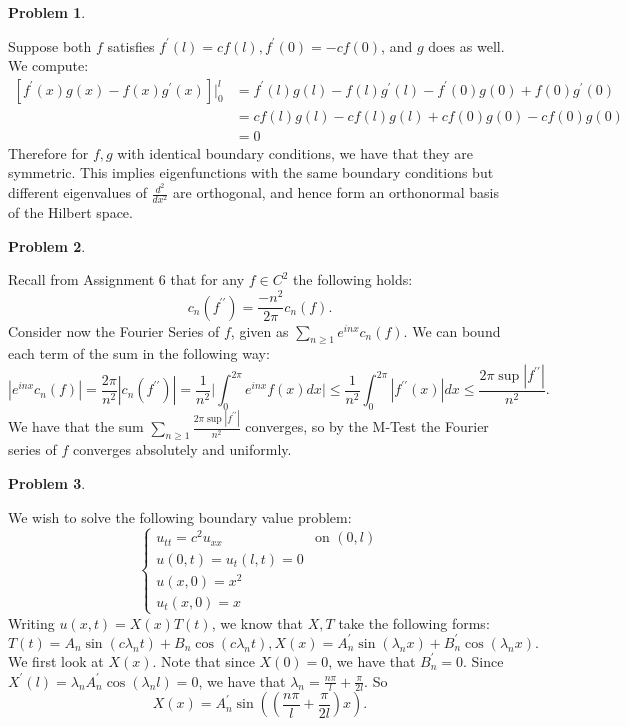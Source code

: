 \documentclass[12pt, a4paper]{article}
\title{}
\author{A.N.}
\date{\today}
\newtheorem{problem}{Problem}
\theoremstyle{definition}
\begin{document}
\begin{problem}
\end{problem}
 Suppose both $f$ satisfies $f^\prime(l) =cf(l), f^\prime(0) = - cf(0)$, and $g$ does as well.  We compute: 
 \begin{align*}
 \left[f^\prime(x) g(x) - f(x)g^\prime(x)\right] \Big|_0^l& = f^\prime(l)g(l) - f(l)g^\prime(l)- f^\prime(0)g(0) + f(0)g^\prime(0)
 \\ & = cf(l)g(l)-cf(l)g(l)+ cf(0)g(0)- cf(0)g(0)
 \\ & = 0
 \end{align*}
 Therefore for $f,g$ with identical boundary conditions, we have that they are symmetric. This implies eigenfunctions with the same boundary conditions but different eigenvalues of $\frac{d^2}{dx^2}$ are orthogonal, and hence form an orthonormal basis of the Hilbert space. 
 \newpage 
\begin{problem}
\end{problem}
Recall from Assignment 6 that for any $f\in C^2$ the following holds: $$c_n(f^{\prime \prime}) = \frac{-n^2}{2\pi} c_n(f).$$
Consider now the Fourier Series of $f$, given as $\sum_{n\geq 1}e^{inx}c_n(f)$. We can bound each term of the sum in the following way: 
$$|e^{inx}c_n(f)| = \frac{2\pi}{n^2}|c_n(f^{\prime \prime})| = \frac{1}{n^2} \Big|\int_0^{2\pi } e^{inx}f(x) dx
 \Big| \leq \frac{1}{n^2} \int_0^{2\pi} |f^{\prime \prime}(x)|dx \leq \frac{2\pi \sup|f^{\prime \prime}|}{n^2}.$$
 We have that the sum $\sum_{n\geq 1} \frac{2\pi \sup |f^{\prime \prime}|}{n^2}$ converges, so by the M-Test the Fourier series of $f$ converges absolutely and uniformly.
 \newpage 
\begin{problem}
\end{problem}
We wish to solve the following boundary value problem: 
$$\begin{cases}
	u_{tt} = c^2u_{xx} &\text{on $(0,l)$}\\
	u(0,t) = u_t(l,t) = 0 \\
	u(x,0)=x^2\\
	u_t(x,0) = x
\end{cases}$$
Writing $u(x,t) = X(x)T(t)$, we know that $X,T$ take the following forms: 
$$T(t) = A_n \sin(c\lambda_n t) + B_n \cos (c \lambda_n t), X(x) = A_n^\prime \sin(\lambda_n x) + B_n^\prime \cos(\lambda_n x).$$
We first look at $X(x)$. Note that since $X(0)=0$, we have that $B_n^\prime = 0$. Since $X^\prime(l)= \lambda_n A^\prime_n \cos(\lambda_n l) = 0$, we have that $\lambda_n = \frac{n\pi}{l} + \frac{\pi}{2l}$. So $$X(x) = A_n^\prime \sin \left(\left(\frac{n\pi}{l} + \frac{\pi}{2l}\right)x \right).$$ 
\end{document}
